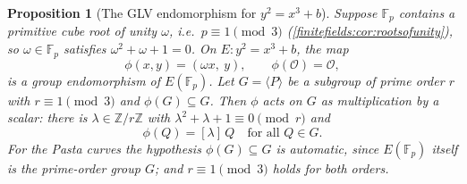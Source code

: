 \documentclass[11pt,a4paper]{article}
\newtheorem{proposition}[theorem]{Proposition}
\theoremstyle{definition}
\theoremstyle{remark}
\newcommand{\Z}{\ensuremath{\mathbb{Z}}}
\newcommand{\Fp}{\ensuremath{\mathbb{F}_{p}}}
\begin{document}
\begin{proposition}[The GLV endomorphism for \(y^2 = x^3 + b\)]
\label{ellipticcurves:prop-glv}
Suppose \(\Fp\) contains a primitive cube root of unity \(\omega\),
i.e.\ \(p \equiv 1 \pmod 3\)
(\cref{finitefields:cor:rootsofunity}), so
\(\omega \in \Fp\) satisfies \(\omega^2 + \omega + 1 = 0\). On
\(E : y^2 = x^3 + b\), the map
\[
  \phi(x, y) = (\omega x,\ y), \qquad \phi(\mathcal{O}) = \mathcal{O},
\]
is a group endomorphism of \(E(\Fp)\). Let \(G = \langle P \rangle\) be
a subgroup of prime order \(r\) with \(r \equiv 1 \pmod 3\) and
\(\phi(G) \subseteq G\). Then \(\phi\) acts on \(G\) as multiplication
by a scalar: there is \(\lambda \in \Z/r\Z\) with
\(\lambda^2 + \lambda + 1 \equiv 0 \pmod r\) and
\[
  \phi(Q) = [\lambda]\,Q \quad\text{for all } Q \in G .
\]
For the Pasta curves the hypothesis \(\phi(G) \subseteq G\) is
automatic, since \(E(\Fp)\) itself is the prime-order group \(G\); and
\(r \equiv 1 \pmod 3\) holds for both orders.
\end{proposition}
\end{document}
